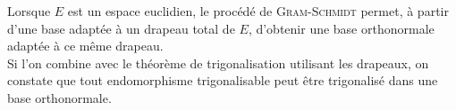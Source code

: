 Lorsque $E$ est un espace euclidien, le procédé de \textsc{Gram}-\textsc{Schmidt} permet, à partir d'une base adaptée à un drapeau total de $E$, d'obtenir une base orthonormale adaptée à ce même drapeau. \\
Si l'on combine avec le théorème de trigonalisation utilisant les drapeaux, on constate que tout endomorphisme trigonalisable peut être trigonalisé dans une base orthonormale. \\

